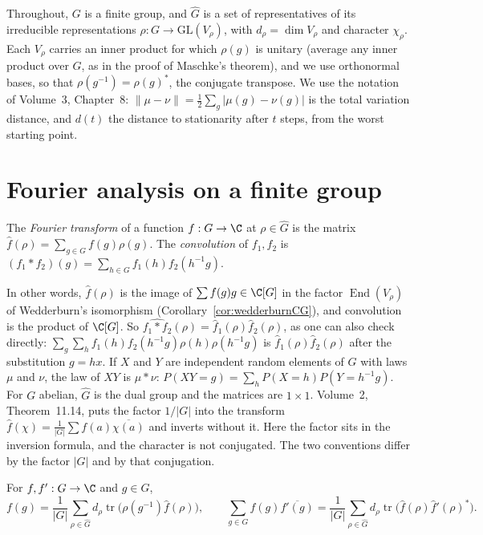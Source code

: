 Throughout, $G$ is a finite group, and $\widehat G$ is a set of representatives of its irreducible representations $\rho:G\to\mathrm{GL}(V_\rho)$, with $d_\rho=\dim V_\rho$ and character $\chi_\rho$. Each $V_\rho$ carries an inner product for which $\rho(g)$ is unitary (average any inner product
over $G$, as in the proof of Maschke's theorem), and we use orthonormal bases, so that $\rho(g^{-1})=\rho(g)^*$, the conjugate transpose. We use the notation of Volume~3, Chapter~8: $\|\mu-\nu\|=\frac12\sum_g|\mu(g)-\nu(g)|$ is the total variation distance, and $d(t)$ the
distance to stationarity after $t$ steps, from the worst starting point.

\section{Fourier analysis on a finite group}

\begin{definition}\label{def:fouriergroup}
The \emph{Fourier transform} of a function $f:G\to\C$ at $\rho\in\widehat G$ is the matrix $\hat f(\rho)=\sum_{g\in G}f(g)\rho(g)$. The \emph{convolution} of $f_1,f_2$ is $(f_1*f_2)(g)=\sum_{h\in G}f_1(h)f_2(h^{-1}g)$.
\end{definition}

In other words, $\hat f(\rho)$ is the image of $\sum f(g)g\in\C[G]$ in the factor $\operatorname{End}(V_\rho)$ of Wedderburn's isomorphism (Corollary~\ref{cor:wedderburnCG}), and convolution is the product of $\C[G]$. So $\widehat{f_1*f_2}(\rho)=\hat f_1(\rho)\hat f_2(\rho)$, as one can also
check directly: $\sum_g\sum_hf_1(h)f_2(h^{-1}g)\rho(h)\rho(h^{-1}g)$ is $\hat f_1(\rho)\hat f_2(\rho)$ after the substitution $g=hx$. If $X$ and $Y$ are independent random elements of $G$ with laws $\mu$ and $\nu$, the law of $XY$ is $\mu*\nu$: $P(XY=g)=\sum_hP(X=h)P(Y=h^{-1}g)$.
For $G$ abelian, $\widehat G$ is the dual group and the matrices are $1\times1$. Volume~2, Theorem~11.14, puts the factor $1/|G|$ into the transform $\hat f(\chi)=\frac1{|G|}\sum f(a)\overline{\chi(a)}$ and inverts without it. Here the factor sits in the inversion formula, and the character is not conjugated. The two conventions differ by the factor $|G|$ and by that conjugation.

\begin{theorem}\label{thm:plancherelG}
For $f,f':G\to\C$ and $g\in G$,
\[
f(g)=\frac1{|G|}\sum_{\rho\in\widehat G}d_\rho\operatorname{tr}\bigl(\rho(g^{-1})\hat f(\rho)\bigr),\qquad
\sum_{g\in G}f(g)\overline{f'(g)}=\frac1{|G|}\sum_{\rho\in\widehat G}d_\rho\operatorname{tr}\bigl(\hat f(\rho)\hat f'(\rho)^*\bigr).
\]
\end{theorem}

